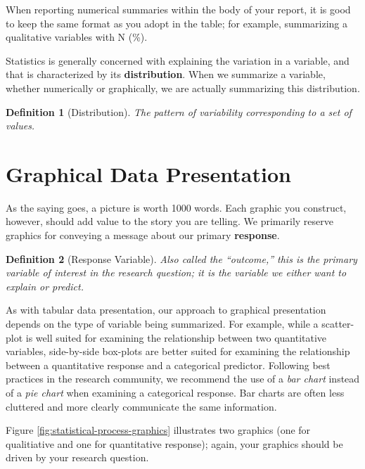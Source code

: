 \documentclass[
]{book}
\theoremstyle{plain}
\theoremstyle{mydefn}
\newtheorem{definition}{Definition}[chapter]
\theoremstyle{myexmpl}
\theoremstyle{remark}
\begin{document}
When reporting numerical summaries within the body of your report, it is good to keep the same format as you adopt in the table; for example, summarizing a qualitative variables with N (\%).

Statistics is generally concerned with explaining the variation in a variable, and that is characterized by its \textbf{distribution}. When we summarize a variable, whether numerically or graphically, we are actually summarizing this distribution.

\begin{definition}[Distribution]
The pattern of variability corresponding to a set of values.
\end{definition}

\hypertarget{graphical-data-presentation}{%
\section{Graphical Data Presentation}\label{graphical-data-presentation}}

As the saying goes, a picture is worth 1000 words. Each graphic you construct, however, should add value to the story you are telling. We primarily reserve graphics for conveying a message about our primary \textbf{response}.

\begin{definition}[Response Variable]
Also called the ``outcome,'' this is the primary variable of interest in the research question; it is the variable we either want to explain or predict.
\end{definition}

As with tabular data presentation, our approach to graphical presentation depends on the type of variable being summarized. For example, while a scatter-plot is well suited for examining the relationship between two quantitative variables, side-by-side box-plots are better suited for examining the relationship between a quantitative response and a categorical predictor. Following best practices in the research community, we recommend the use of a \emph{bar chart} instead of a \emph{pie chart} when examining a categorical response. Bar charts are often less cluttered and more clearly communicate the same information.

Figure \ref{fig:statistical-process-graphics} illustrates two graphics (one for qualitiative and one for quantitative response); again, your graphics should be driven by your research question.
\end{document}
